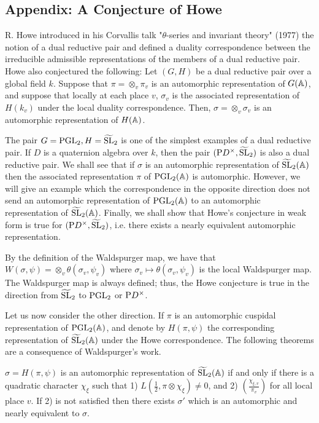 \begin{appendices}
\section{Appendix: A Conjecture of Howe}

R. Howe introduced in his Corvallis talk "$\theta$-series and invariant theory" (1977) the notion of a dual reductive pair and defined a duality correspondence between the irreducible admissible representations of the members of a dual reductive pair.
Howe also conjectured the following: Let $(G, H)$ be a dual reductive pair over a global field $k$.
Suppose that $\pi = \otimes_v \pi_v$ is an automorphic representation of $G(\mathbb{A})$, and suppose that locally at each place $v$, $\sigma_v$ is the associated representation of $H(k_v)$ under the local duality correspondence.
Then, $\sigma = \otimes_v \sigma_v$ is an automorphic representation of $H(\mathbb{A})$.

The pair $G = \mathrm{PGL}_2, H = \widetilde{\mathrm{SL}}_2$ is one of the simplest examples of a dual reductive pair.
If $D$ is a quaternion algebra over $k$, then the pair $(\mathrm{P} D^\times, \widetilde{\mathrm{SL}}_2)$ is also a dual reductive pair. 
We shall see that if $\sigma$ is an automorphic representation of $\widetilde{\mathrm{SL}}_2(\mathbb{A})$ then the associated representation $\pi$ of $\mathrm{PGL}_2(\mathbb{A})$ is automorphic.
However, we will give an example which the correspondence in the opposite direction does not send an automorphic representation of $\mathrm{PGL}_2(\mathbb{A})$ to an automorphic representation of $\widetilde{\mathrm{SL}}_2(\mathbb{A})$.
Finally, we shall show that Howe's conjecture in weak
form is true for $(\mathrm{P} D^\times, \widetilde{\mathrm{SL}}_2)$, i.e. there exists a nearly equivalent automorphic representation.

By the definition of the Waldspurger map, we have that $W(\sigma, \psi) = \otimes_v \theta(\sigma_v, \psi_v)$ where $\sigma_v \mapsto \theta(\sigma_v, \psi_v)$ is the local Waldspurger map.
The Waldspurger map is always defined; thus, the Howe conjecture is true in the direction from $\widetilde{\mathrm{SL}}_2$ to $\mathrm{PGL}_2$ or $\mathrm{P} D^\times$.

Let us now consider the other direction.
If $\pi$ is an automorphic cuspidal representation of $\mathrm{PGL}_2(\mathbb{A})$, and denote by $H(\pi, \psi)$ the
corresponding representation of $\widetilde{\mathrm{SL}}_2(\mathbb{A})$ under the Howe correspondence.
The following theorems are a consequence of Waldspurger's work.

\begin{theorem}
\label{thm:a.1}
$\sigma = H(\pi, \psi)$ is an automorphic representation of $\widetilde{\mathrm{SL}}_2(\mathbb{A})$ if and only if there is a quadratic character $\chi_\xi$ such that 1) $L(\frac{1}{2}, \pi \otimes \chi_\xi) \neq 0$, and 2) $\left(\frac{\chi_{\xi, v}}{\pi_v}\right)$ for all local place $v$.
If 2) is not satisfied then there exists $\sigma'$ which is an automorphic and nearly equivalent to $\sigma$.
\end{theorem}


\end{appendices}
